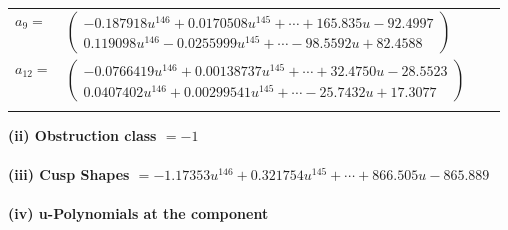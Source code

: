 \documentclass[1p]{elsarticle_modified}
\theoremstyle{definition}
\begin{document}
\begin{tabular}{m{7pt} m{180pt} m{7pt} m{180pt} }
\flushright $a_{9}=$&$\begin{pmatrix}-0.187918 u^{146}+0.0170508 u^{145}+\cdots+165.835 u-92.4997\\0.119098 u^{146}-0.0255999 u^{145}+\cdots-98.5592 u+82.4588\end{pmatrix}$ \\
\flushright $a_{12}=$&$\begin{pmatrix}-0.0766419 u^{146}+0.00138737 u^{145}+\cdots+32.4750 u-28.5523\\0.0407402 u^{146}+0.00299541 u^{145}+\cdots-25.7432 u+17.3077\end{pmatrix}$\\&\end{tabular}
\flushleft \textbf{(ii) Obstruction class $= -1$}\\~\\
\flushleft \textbf{(iii) Cusp Shapes $= -1.17353 u^{146}+0.321754 u^{145}+\cdots+866.505 u-865.889$}\\~\\
\newpage\renewcommand{\arraystretch}{1}
\flushleft \textbf{(iv) u-Polynomials at the component}\newline \\
\end{document}
